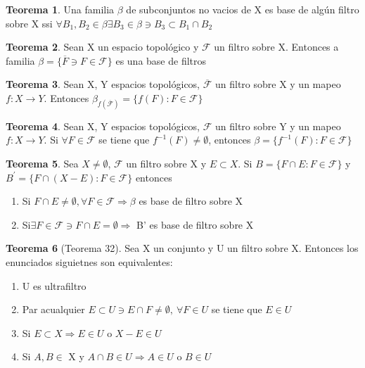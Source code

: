 \documentclass{article}
\theoremstyle{definition}
\newtheorem{theorem}{Teorema}[section]
\begin{document}

\begin{theorem}
	Una familia $\beta$ de subconjuntos no vacios de X es base de algún filtro sobre X ssi $\forall B_1,B_2 \in \beta\exists B_3\in\beta\ni B_3\subset B_1\cap B_2$
\end{theorem}


\begin{theorem}
	Sean X un espacio topológico y $\mathcal{F}$ un filtro sobre X. Entonces a familia $\beta=\{\overline{F}\ni F\in \mathcal{F}\}$ es una base de filtros
\end{theorem}


\begin{theorem}
	Sean X, Y espacios topológicos, $\overline{\mathcal{F}}$ un filtro sobre X y un mapeo $f:X\to Y$. Entonces $\beta_{f(\overline{\mathcal{F}})}=\{f(F):F\in \mathcal{F}\}$
\end{theorem}


\begin{theorem}
	Sean X, Y espacios topológicos, $\mathcal{F}$ un filtro sobre Y y un mapeo $f:X\to Y$. Si $\forall F\in \mathcal{F}$ se tiene que $f^{-1}(F)\neq\emptyset$, entonces $\beta=\{f^{-1}(F):F\in \mathcal{F}\}$
\end{theorem}


\begin{theorem}
	Sea $X\neq\emptyset$, $\mathcal{F}$ un filtro sobre X y $E\subset X$. Si $B=\{F\cap E: F\in \mathcal{F}\}$ 
y $B^{'}=\{F\cap (X-E): F\in \mathcal{F}\}$ entonces 
	\begin{enumerate}
		\item Si $F\cap E\neq \emptyset, \forall F\in \mathcal{F}\Rightarrow \beta$ es base de filtro sobre X
		\item Si$\exists F\in \mathcal{F}\ni F\cap E = \emptyset \Rightarrow$ B' es base de filtro sobre X 
	\end{enumerate}
\end{theorem}


\begin{theorem}[Teorema 32]
	Sea X un conjunto y U un filtro sobre X. Entonces los enunciados siguietnes son equivalentes:
	\begin{enumerate}
		\item U es ultrafiltro
		\item Par acualquier $E\subset U\ni E\cap F\neq \emptyset,\ \forall F\in U$ se tiene que $E\in U$
		\item Si $E\subset X\Rightarrow E\in U$ o $X-E\in U$
		\item Si $A, B\in$ X y $ A\cap B\in U\Rightarrow A\in U$ o $ B\in U$
	\end{enumerate}
\end{theorem}
\end{document}
